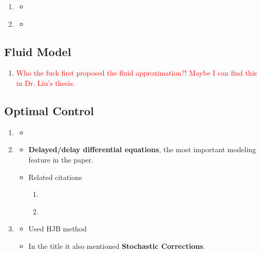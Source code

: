 \begin{enumerate}
\item \citet{koccauga2010admission}
\begin{itemize}
    \item 
\end{itemize}

\item \citet{ward2008asymptotically}
\begin{itemize}
    \item 
\end{itemize}

\end{enumerate}

\subsection{Fluid Model}
\begin{enumerate}
\item \textcolor{red}{Who the fuck first proposed the fluid approximation?! Maybe I can find this in Dr. Liu's thesis.}
\end{enumerate}
\subsection{Optimal Control}
\begin{enumerate}
\item \citet{cudina2006asymptotically}
\begin{itemize}
    \item 
\end{itemize}

\item \citet{aravindakshan2015understanding}
\begin{itemize}
    \item \textbf{Delayed/delay differential equations}, the most important modeling feature in the paper.
    \item
    Related citations
    \begin{enumerate}
        \item \citet{kharatishvili1967maximum}
        \item \citet{avrani1997optimal}
    \end{enumerate}
\end{itemize}

\item \citet{avrani1997optimal}
\begin{itemize}
    \item Used HJB method
    \item In the title it also mentioned \textbf{Stochastic Corrections}.
\end{itemize}

\end{enumerate}

